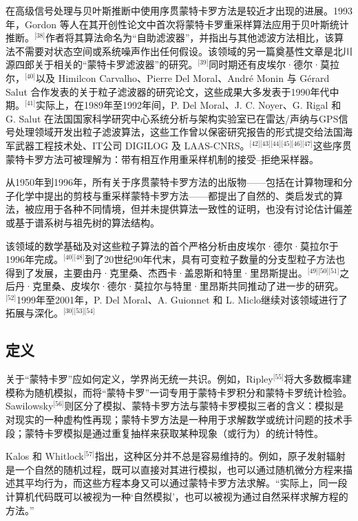在高级信号处理与贝叶斯推断中使用序贯蒙特卡罗方法是较近才出现的进展。1993年，Gordon 等人在其开创性论文中首次将蒙特卡罗重采样算法应用于贝叶斯统计推断。\(^\text{[38]}\)作者将其算法命名为“自助滤波器”，并指出与其他滤波方法相比，该算法不需要对状态空间或系统噪声作出任何假设。该领域的另一篇奠基性文章是北川源四郎关于相关的“蒙特卡罗滤波器”的研究。\(^\text{[39]}\)同时期还有皮埃尔·德尔·莫拉尔，\(^\text{[40]}\)以及 Himilcon Carvalho、Pierre Del Moral、André Monin 与 Gérard Salut 合作发表的关于粒子滤波器的研究论文，这些成果大多发表于1990年代中期。\(^\text{[41]}\)实际上，在1989年至1992年间，P. Del Moral、J. C. Noyer、G. Rigal 和 G. Salut 在法国国家科学研究中心系统分析与架构实验室已在雷达/声纳与GPS信号处理领域开发出粒子滤波算法，这些工作曾以保密研究报告的形式提交给法国海军武器工程技术处、IT公司 DIGILOG 及 LAAS-CNRS。\(^\text{[42][43][44][45][46][47]}\)这些序贯蒙特卡罗方法可被理解为：带有相互作用重采样机制的接受–拒绝采样器。

从1950年到1996年，所有关于序贯蒙特卡罗方法的出版物——包括在计算物理和分子化学中提出的剪枝与重采样蒙特卡罗方法——都提出了自然的、类启发式的算法，被应用于各种不同情境，但并未提供算法一致性的证明，也没有讨论估计偏差或基于谱系树与祖先树的算法结构。

该领域的数学基础及对这些粒子算法的首个严格分析由皮埃尔·德尔·莫拉尔于1996年完成。\(^\text{[40][48]}\)到了20世纪90年代末，具有可变粒子数量的分支型粒子方法也得到了发展，主要由丹·克里桑、杰西卡·盖恩斯和特里·里昂斯提出。\(^\text{[49][50][51]}\)之后丹·克里桑、皮埃尔·德尔·莫拉尔与特里·里昂斯共同推动了进一步的研究。\(^\text{[52]}\)1999年至2001年，P. Del Moral、A. Guionnet 和 L. Miclo继续对该领域进行了拓展与深化。\(^\text{[30][53][54]}\)
\subsection{定义}
关于“蒙特卡罗”应如何定义，学界尚无统一共识。例如，Ripley\(^\text{[55]}\)将大多数概率建模称为随机模拟，而将“蒙特卡罗”一词专用于蒙特卡罗积分和蒙特卡罗统计检验。Sawilowsky\(^\text{[56]}\)则区分了模拟、蒙特卡罗方法与蒙特卡罗模拟三者的含义：模拟是对现实的一种虚构性再现；蒙特卡罗方法是一种用于求解数学或统计问题的技术手段；蒙特卡罗模拟是通过重复抽样来获取某种现象（或行为）的统计特性。

Kalos 和 Whitlock\(^\text{[57]}\)指出，这种区分并不总是容易维持的。例如，原子发射辐射是一个自然的随机过程，既可以直接对其进行模拟，也可以通过随机微分方程来描述其平均行为，而这些方程本身又可以通过蒙特卡罗方法求解。“实际上，同一段计算机代码既可以被视为一种‘自然模拟’，也可以被视为通过自然采样求解方程的方法。”

